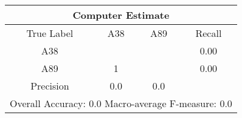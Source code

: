 \begin{tabular}{|c||c|c||c|}
\hline 
\multicolumn{4}{|c|}{Computer Estimate}\\
\hline 
True Label & A38 & A89 & Recall \\
\hline 
A38 &  & & 0.00\\
A89 & 1 &  & 0.00\\
\hline 
Precision & 0.0 & 0.0 & \\
\hline 
\multicolumn{4}{|c|}{Overall Accuracy: 0.0 Macro-average F-measure: 0.0}\\
\hline 
\end{tabular} 
